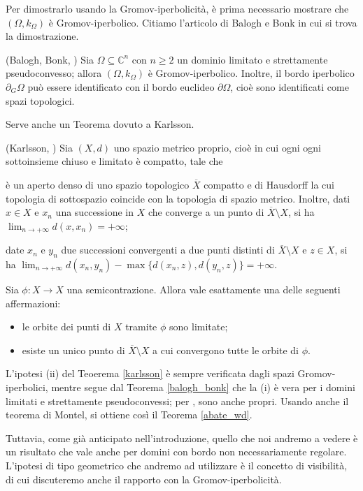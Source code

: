 Per dimostrarlo usando la Gromov-iperbolicità, è prima necessario mostrare che $(\Omega,k_{\Omega})$ è Gromov-iperbolico. Citiamo l'articolo di Balogh e Bonk in cui si trova la dimostrazione.

\begin{thm} \label{balogh_bonk}
    (Balogh, Bonk, \cite[Theorem 1.4]{BB}) Sia $\Omega \subseteq \mathbb{C}^n$ con $n \ge 2$ un dominio limitato e strettamente pseudoconvesso; allora $(\Omega,k_{\Omega})$ è Gromov-iperbolico. Inoltre, il bordo iperbolico $\partial_G\Omega$ può essere identificato con il bordo euclideo $\partial\Omega$, cioè sono identificati come spazi topologici.
\end{thm}

Serve anche un Teorema dovuto a Karlsson.

\begin{thm} \label{karlsson}
    (Karlsson, \cite[Corollary 3.7]{Ka}) Sia $(X,d)$ uno spazio metrico proprio, cioè in cui ogni ogni sottoinsieme chiuso e limitato è compatto, tale che
    \begin{nlist}
        \item è un aperto denso di uno spazio topologico $\overline{X}$ compatto e di Hausdorff la cui topologia di sottospazio coincide con la topologia di spazio metrico. Inoltre, dati $x \in X$ e $x_n$ una successione in $X$ che converge a un punto di $\overline{X}\setminus X$, si ha $\displaystyle\lim_{n\longrightarrow+\infty}d(x,x_n)=+\infty$;
        \item date $x_n$ e $y_n$ due successioni convergenti a due punti distinti di $\overline{X}\setminus X$ e $z \in X$, si ha $\displaystyle\lim_{n\longrightarrow+\infty} d(x_n,y_n)-\max\{d(x_n,z),d(y_n,z)\}=+\infty$.
    \end{nlist}
    Sia $\phi:X \longrightarrow X$ una semicontrazione. Allora vale esattamente una delle seguenti affermazioni:
    \begin{itemize}
        \item le orbite dei punti di $X$ tramite $\phi$ sono limitate;
        \item esiste un unico punto di $\overline{X}\setminus X$ a cui convergono tutte le orbite di $\phi$.
    \end{itemize}
\end{thm}

L'ipotesi (ii) del Teoerema \ref{karlsson} è sempre verificata dagli spazi Gromov-iperbolici, mentre segue dal Teorema \ref{balogh_bonk} che la (i) è vera per i domini limitati e strettamente pseudoconvessi; per \cite[Paragraph 3.3]{G}, sono anche propri. Usando anche il teorema di Montel, si ottiene così il Teorema \ref{abate_wd}.

Tuttavia, come già anticipato nell'introduzione, quello che noi andremo a vedere è un risultato che vale anche per domini con bordo non necessariamente regolare. L'ipotesi di tipo geometrico che andremo ad utilizzare è il concetto di visibilità, di cui discuteremo anche il rapporto con la Gromov-iperbolicità.